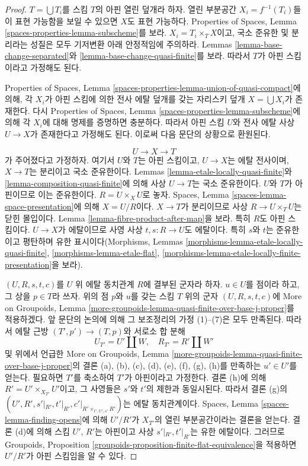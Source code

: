 \begin{proof}
$T = \bigcup T_i$를 스킴 $T$의 아핀 열린 덮개라 하자. 열린 부분공간
$X_i = f^{-1}(T_i)$들이 표현 가능함을 보일 수 있으면 $X$도 표현
가능하다. Properties of Spaces, Lemma
\ref{spaces-properties-lemma-subscheme}를 보라. $X_i = T_i \times_T X$이고,
국소 준유한 및 분리라는 성질은 모두 기저변환 아래 안정적임에 주의하라.
Lemmas \ref{lemma-base-change-separated}와
\ref{lemma-base-change-quasi-finite}를 보라. 따라서 $T$가 아핀
스킴이라고 가정해도 된다.

\medskip\noindent
Properties of Spaces, Lemma
\ref{spaces-properties-lemma-union-of-quasi-compact}에 의해, 각 $X_i$가
아핀 스킴에 의한 전사 에탈 덮개를 갖는 자리스키 덮개
$X = \bigcup X_i$가 존재한다. 다시 Properties of Spaces, Lemma
\ref{spaces-properties-lemma-subscheme}에 의해 각 $X_i$에 대해 명제를
증명하면 충분하다. 따라서 아핀 스킴 $U$와 전사 에탈 사상
$U \to X$가 존재한다고 가정해도 된다. 이로써 다음 문단의 상황으로
환원된다.

\medskip\noindent
$$
U \longrightarrow X \longrightarrow T
$$
가 주어졌다고 가정하자. 여기서 $U$와 $T$는 아핀 스킴이고,
$U \to X$는 에탈 전사이며, $X \to T$는 분리이고 국소 준유한이다.
Lemmas \ref{lemma-etale-locally-quasi-finite}와
\ref{lemma-composition-quasi-finite}에 의해 사상 $U \to T$는 국소
준유한이다. $U$와 $T$가 아핀이므로 이는 준유한이다.
$R = U \times_X U$로 놓자. Spaces, Lemma
\ref{spaces-lemma-space-presentation}에 의해 $X = U/R$이다.
$X \to T$가 분리이므로 사상 $R \to U \times_T U$는 닫힌 몰입이다.
Lemma \ref{lemma-fibre-product-after-map}을 보라. 특히 $R$도 아핀
스킴이다. $U \to X$가 에탈이므로 사영 사상
$t, s : R \to U$도 에탈이다. 특히 $s$와 $t$는 준유한이고 평탄하며
유한 표시이다(Morphisms, Lemmas
\ref{morphisms-lemma-etale-locally-quasi-finite},
\ref{morphisms-lemma-etale-flat},
\ref{morphisms-lemma-etale-locally-finite-presentation}을 보라).

\medskip\noindent
$(U, R, s, t, c)$를 $U$ 위 에탈 동치관계 $R$에 결부된 군자라 하자.
$u \in U$를 점이라 하고, 그 상을 $p \in T$라 쓰자. 위의 점 $p$와
$u$를 갖는 스킴 $T$ 위의 군자 $(U, R, s, t, c)$에 More on Groupoids,
Lemma \ref{more-groupoids-lemma-quasi-finite-over-base-j-proper}를
적용하겠다. 앞 문단의 논의에 의해 그 보조정리의 가정 (1)--(7)은 모두
만족된다. 따라서 에탈 근방 $(T', p') \to (T, p)$와 서로소 합 분해
$$
U_{T'} = U' \amalg W, \quad
R_{T'} = R' \amalg W'
$$
및 위에서 언급한 More on Groupoids, Lemma
\ref{more-groupoids-lemma-quasi-finite-over-base-j-proper}의 결론
(a), (b), (c), (d), (e), (f), (g), (h)를 만족하는 $u' \in U'$를 얻는다.
필요하면 $T'$를 축소하여 $T'$가 아핀이라고 가정한다. 결론 (h)에 의해
$R' = U' \times_{X_{T'}} U'$이고, 그 사영들은 $s'$와 $t'$의 제한과
동일시된다. 따라서 결론 (g)의
$(U', R', s'|_{R'}, t'|_{R'}, c'|_{R' \times_{t', U', s'} R'})$는 에탈
동치관계이다. Spaces, Lemma \ref{spaces-lemma-finding-opens}에 의해
$U'/R'$가 $X_{T'}$의 열린 부분공간이라는 결론을 얻는다. 결론 (d)에
의해 스킴 $U'$, $R'$는 아핀이고 사상 $s'|_{R'}, t'|_{R'}$는 유한
에탈이다. 그러므로 Groupoids, Proposition
\ref{groupoids-proposition-finite-flat-equivalence}을 적용하면
$U'/R'$가 아핀 스킴임을 알 수 있다.


\end{proof}

